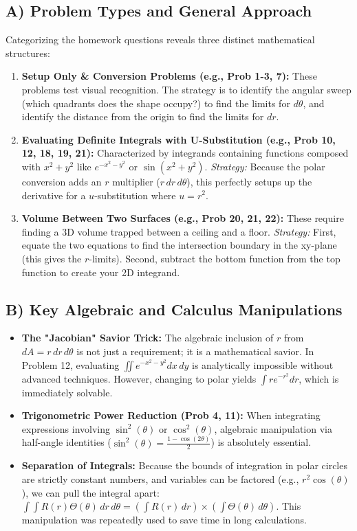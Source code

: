 \documentclass[12pt]{article}
\begin{document}
\subsection{A) Problem Types and General Approach}
Categorizing the homework questions reveals three distinct mathematical structures:

\begin{enumerate}
    \item \textbf{Setup Only \& Conversion Problems (e.g., Prob 1-3, 7):}
    These problems test visual recognition. The strategy is to identify the angular sweep (which quadrants does the shape occupy?) to find the limits for $d\theta$, and identify the distance from the origin to find the limits for $dr$.
    
    \item \textbf{Evaluating Definite Integrals with U-Substitution (e.g., Prob 10, 12, 18, 19, 21):}
    Characterized by integrands containing functions composed with $x^2+y^2$ like $e^{-x^2-y^2}$ or $\sin(x^2+y^2)$. 
    \textit{Strategy:} Because the polar conversion adds an $r$ multiplier ($r \, dr \, d\theta$), this perfectly setups up the derivative for a $u$-substitution where $u = r^2$.

    \item \textbf{Volume Between Two Surfaces (e.g., Prob 20, 21, 22):}
    These require finding a 3D volume trapped between a ceiling and a floor. 
    \textit{Strategy:} First, equate the two equations to find the intersection boundary in the xy-plane (this gives the $r$-limits). Second, subtract the bottom function from the top function to create your 2D integrand.
\end{enumerate}

\subsection{B) Key Algebraic and Calculus Manipulations}
\begin{itemize}
    \item \textbf{The "Jacobian" Savior Trick:} The algebraic inclusion of $r$ from $dA = r \, dr \, d\theta$ is not just a requirement; it is a mathematical savior. In Problem 12, evaluating $\iint e^{-x^2-y^2} dx \, dy$ is analytically impossible without advanced techniques. However, changing to polar yields $\int r e^{-r^2} dr$, which is immediately solvable.
    \item \textbf{Trigonometric Power Reduction (Prob 4, 11):} When integrating expressions involving $\sin^2(\theta)$ or $\cos^2(\theta)$, algebraic manipulation via half-angle identities ($\sin^2(\theta) = \frac{1 - \cos(2\theta)}{2}$) is absolutely essential.
    \item \textbf{Separation of Integrals:} Because the bounds of integration in polar circles are strictly constant numbers, and variables can be factored (e.g., $r^2\cos(\theta)$), we can pull the integral apart: $\int \int R(r)\Theta(\theta) \, dr \, d\theta = (\int R(r) \, dr) \times (\int \Theta(\theta) \, d\theta)$. This manipulation was repeatedly used to save time in long calculations.
\end{itemize}
\end{document}
